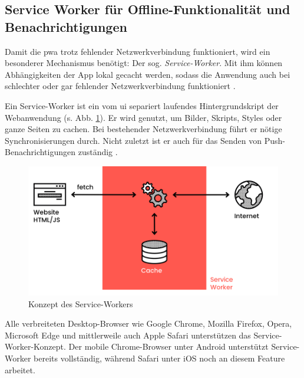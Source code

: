 \subsection{Service Worker für Offline-Funktionalität und Benachrichtigungen}
\label{sub:service_worker}

Damit die \ac{pwa} trotz fehlender Netzwerkverbindung funktioniert, wird ein besonderer Mechanismus benötigt: Der sog. \textit{Service-Worker}. Mit ihm können Abhängigkeiten der App lokal gecacht werden, sodass die Anwendung auch bei schlechter oder gar fehlender Netzwerkverbindung funktioniert \cite[S. 7]{BeginningPWA}.

Ein Service-Worker ist ein vom \ac{ui} separiert laufendes Hintergrundskript der Webanwendung (s. Abb. \ref{fig:serviceWorker}). Er wird genutzt, um Bilder, Skripts, Styles oder ganze Seiten zu cachen. Bei bestehender Netzwerkverbindung führt er nötige Synchronisierungen durch. Nicht zuletzt ist er auch für das Senden von Push-Benachrichtigungen zuständig \cite[S. 24]{BeginningPWA}.
%
\begin{figure}[h!]
        \includegraphics[width=\linewidth]{img/fig/2-4-2_Service_Worker_Concept.png}
        \centering
        \caption[Konzept des Service-Workers]{Konzept des Service-Workers \cite{ServiceWorkerDiagramm}}
        \label{fig:serviceWorker}
\end{figure}
%

Alle verbreiteten Desktop-Browser wie Google Chrome, Mozilla Firefox, Opera, Microsoft Edge und mittlerweile auch Apple Safari unterstützen das Service-Worker-Konzept. Der mobile Chrome-Browser unter Android unterstützt Service-Worker bereits vollständig, während Safari unter iOS noch an diesem Feature arbeitet. \cite[S. 9]{BeginningPWA}
%



